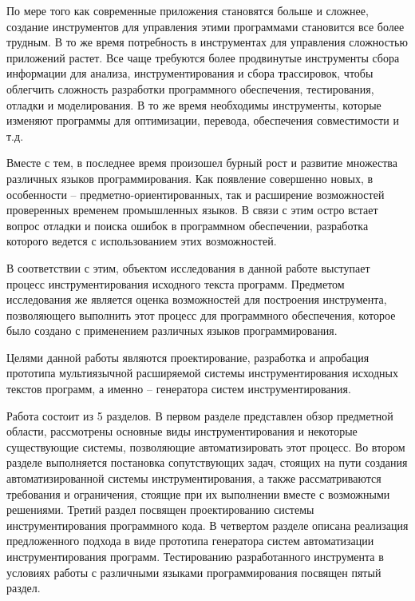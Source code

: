 \intro

По мере того как современные приложения становятся больше и сложнее, создание инструментов для управления этими программами становится все более трудным.
В то же время потребность в инструментах для управления сложностью приложений растет.
Все чаще требуются более продвинутые инструменты сбора информации для анализа, инструментирования и сбора трассировок, чтобы облегчить сложность разработки программного обеспечения, тестирования, отладки и моделирования.
В то же время необходимы инструменты, которые изменяют программы для оптимизации, перевода, обеспечения совместимости и т.д.

Вместе с тем, в последнее время произошел бурный рост и развитие множества различных языков программирования.
Как появление совершенно новых, в особенности -- предметно-ориентированных, так и расширение возможностей проверенных временем промышленных языков.
В связи с этим остро встает вопрос отладки и поиска ошибок в программном обеспечении, разработка которого ведется с использованием этих возможностей.

В соответствии с этим, объектом исследования в данной работе выступает процесс инструментирования исходного текста программ.
Предметом исследования же является оценка возможностей для построения инструмента, позволяющего выполнить этот процесс для программного обеспечения, которое было создано с применением различных языков программирования.

Целями данной работы являются проектирование, разработка и апробация прототипа мультиязычной расширяемой системы инструментирования исходных текстов программ, а именно -- генератора систем инструментирования.

Работа состоит из 5 разделов.
В первом разделе представлен обзор предметной области, рассмотрены основные виды инструментирования и некоторые существующие системы, позволяющие автоматизировать этот процесс.
Во втором разделе выполняется постановка сопутствующих задач, стоящих на пути создания автоматизированной системы инструментирования, а также рассматриваются требования и ограничения, стоящие при их выполнении вместе с возможными решениями.
Третий раздел посвящен проектированию системы инструментирования программного кода.
В четвертом разделе описана реализация предложенного подхода в виде прототипа генератора систем автоматизации инструментирования программ.
Тестированию разработанного инструмента в условиях работы с различными языками программирования посвящен пятый раздел.

